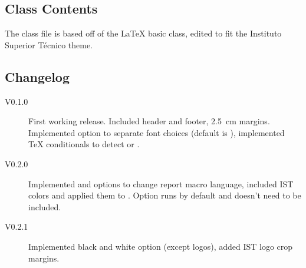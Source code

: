 \subsection{Class Contents}

The class file is based off of the \LaTeX{} basic  class, edited to fit the Instituto Superior Técnico theme.

\subsection{Changelog}

\begin{description}
	\item[V0.1.0] First working release. Included header and footer, \SI{2.5}{\centi\meter} margins. Implemented  option to separate font choices (default is ), implemented \TeX{} conditionals to detect  or .
	\item[V0.2.0] Implemented  and  options to change report macro language, included IST colors and applied them to . Option  runs by default and doesn't need to be included.
	\item[V0.2.1] Implemented black and white option (except logos), added IST logo crop margins.
\end{description}
